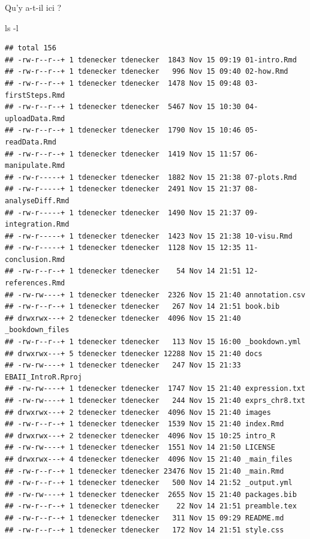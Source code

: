 \documentclass[
]{book}
\newenvironment{Shaded}{\begin{snugshade}}{\end{snugshade}}
\newcommand{\AttributeTok}[1]{\textcolor[rgb]{0.77,0.63,0.00}{#1}}
\newcommand{\FunctionTok}[1]{\textcolor[rgb]{0.00,0.00,0.00}{#1}}
\begin{document}
Qu'y a-t-il ici ?

\begin{Shaded}
\begin{Highlighting}[]
\FunctionTok{ls} \AttributeTok{{-}l}
\end{Highlighting}
\end{Shaded}

\begin{verbatim}
## total 156
## -rw-r--r--+ 1 tdenecker tdenecker  1843 Nov 15 09:19 01-intro.Rmd
## -rw-r--r--+ 1 tdenecker tdenecker   996 Nov 15 09:40 02-how.Rmd
## -rw-r--r--+ 1 tdenecker tdenecker  1478 Nov 15 09:48 03-firstSteps.Rmd
## -rw-r--r--+ 1 tdenecker tdenecker  5467 Nov 15 10:30 04-uploadData.Rmd
## -rw-r--r--+ 1 tdenecker tdenecker  1790 Nov 15 10:46 05-readData.Rmd
## -rw-r--r--+ 1 tdenecker tdenecker  1419 Nov 15 11:57 06-manipulate.Rmd
## -rw-r-----+ 1 tdenecker tdenecker  1882 Nov 15 21:38 07-plots.Rmd
## -rw-r-----+ 1 tdenecker tdenecker  2491 Nov 15 21:37 08-analyseDiff.Rmd
## -rw-r-----+ 1 tdenecker tdenecker  1490 Nov 15 21:37 09-integration.Rmd
## -rw-r-----+ 1 tdenecker tdenecker  1423 Nov 15 21:38 10-visu.Rmd
## -rw-r-----+ 1 tdenecker tdenecker  1128 Nov 15 12:35 11-conclusion.Rmd
## -rw-r--r--+ 1 tdenecker tdenecker    54 Nov 14 21:51 12-references.Rmd
## -rw-rw----+ 1 tdenecker tdenecker  2326 Nov 15 21:40 annotation.csv
## -rw-r--r--+ 1 tdenecker tdenecker   267 Nov 14 21:51 book.bib
## drwxrwx---+ 2 tdenecker tdenecker  4096 Nov 15 21:40 _bookdown_files
## -rw-r--r--+ 1 tdenecker tdenecker   113 Nov 15 16:00 _bookdown.yml
## drwxrwx---+ 5 tdenecker tdenecker 12288 Nov 15 21:40 docs
## -rw-rw----+ 1 tdenecker tdenecker   247 Nov 15 21:33 EBAII_IntroR.Rproj
## -rw-rw----+ 1 tdenecker tdenecker  1747 Nov 15 21:40 expression.txt
## -rw-rw----+ 1 tdenecker tdenecker   244 Nov 15 21:40 exprs_chr8.txt
## drwxrwx---+ 2 tdenecker tdenecker  4096 Nov 15 21:40 images
## -rw-r--r--+ 1 tdenecker tdenecker  1539 Nov 15 21:40 index.Rmd
## drwxrwx---+ 2 tdenecker tdenecker  4096 Nov 15 10:25 intro_R
## -rw-rw----+ 1 tdenecker tdenecker  1551 Nov 14 21:50 LICENSE
## drwxrwx---+ 4 tdenecker tdenecker  4096 Nov 15 21:40 _main_files
## -rw-r--r--+ 1 tdenecker tdenecker 23476 Nov 15 21:40 _main.Rmd
## -rw-r--r--+ 1 tdenecker tdenecker   500 Nov 14 21:52 _output.yml
## -rw-rw----+ 1 tdenecker tdenecker  2655 Nov 15 21:40 packages.bib
## -rw-r--r--+ 1 tdenecker tdenecker    22 Nov 14 21:51 preamble.tex
## -rw-r--r--+ 1 tdenecker tdenecker   311 Nov 15 09:29 README.md
## -rw-r--r--+ 1 tdenecker tdenecker   172 Nov 14 21:51 style.css
\end{verbatim}
\end{document}
